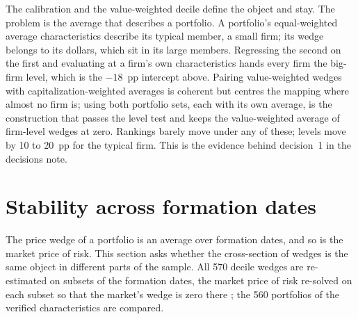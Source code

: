 \documentclass[11pt]{article}
\begin{document}
The calibration and the value-weighted decile define the object and stay.
The problem is the average that describes a portfolio. A portfolio's
equal-weighted average characteristics describe its typical member, a small
firm; its wedge belongs to its dollars, which sit in its large members.
Regressing the second on the first and evaluating at a firm's own
characteristics hands every firm the big-firm level, which is the
$-18$~pp intercept above. Pairing value-weighted wedges with
capitalization-weighted averages is coherent but centres the mapping where
almost no firm is; using both portfolio sets, each with its own average, is
the construction that passes the level test and keeps the value-weighted
average of firm-level wedges at zero. Rankings barely move under any of
these; levels move by 10 to 20~pp for the typical firm. This is the evidence
behind decision~1 in the decisions note.

\section{Stability across formation dates}

The price wedge of a portfolio is an average over formation dates, and so is
the market price of risk. This section asks whether the cross-section of
wedges is the same object in different parts of the sample. All 570 decile
wedges are re-estimated on subsets of the formation dates, the market price
of risk re-solved on each subset so that the market's wedge is zero there
; the 560 portfolios of the verified characteristics are
compared.
\end{document}
